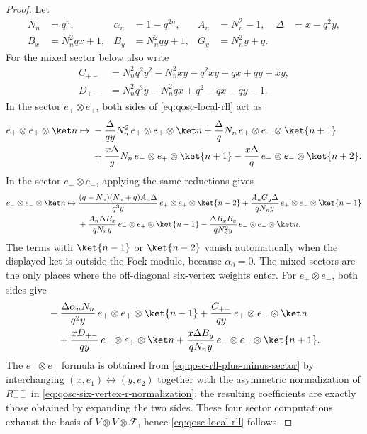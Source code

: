 \begin{proof}
Let
\begin{align*}
  N_n&=q^n,&
  \alpha_n&=1-q^{2n},&
  A_n&=N_n^2-1,&
  \Delta&=x-q^2y,\\
  B_x&=N_n^2qx+1,&
  B_y&=N_n^2qy+1,&
  G_y&=N_n^2y+q .
\end{align*}
For the mixed sector below also write
\begin{align*}
  C_{+-}&=N_n^2q^2y^2-N_n^2xy-q^2xy-qx+qy+xy,\\
  D_{+-}&=N_n^2q^3y-N_n^2qx+q^2+qx-qy-1 .
\end{align*}
In the sector \(e_+\otimes e_+\), both sides of
\eqref{eq:qosc-local-rll} act as
\begin{align}
  e_+\otimes e_+\otimes\ket n
  \mapsto\;&
  -\frac{\Delta}{qy}N_n^2\,e_+\otimes e_+\otimes\ket n
  +\frac{\Delta}{q}N_n\,e_+\otimes e_-\otimes\ket{n+1}
  \nonumber\\
  &+\frac{x\Delta}{y}N_n\,e_-\otimes e_+\otimes\ket{n+1}
  -\frac{x\Delta}{q}\,e_-\otimes e_-\otimes\ket{n+2}.
  \label{eq:qosc-rll-plus-plus-sector}
\end{align}
In the sector \(e_-\otimes e_-\), applying the same reductions gives
\begin{align}
  e_-\otimes e_-\otimes\ket n
  \mapsto\;&
  \frac{(q-N_n)(N_n+q)A_n\Delta}{q^3y}\,
    e_+\otimes e_+\otimes\ket{n-2}
  +\frac{A_nG_y\Delta}{qN_ny}\,
    e_+\otimes e_-\otimes\ket{n-1}
  \nonumber\\
  &+\frac{A_n\Delta B_x}{qN_ny}\,
    e_-\otimes e_+\otimes\ket{n-1}
  -\frac{\Delta B_xB_y}{qN_n^2y}\,
    e_-\otimes e_-\otimes\ket n .
  \label{eq:qosc-rll-minus-minus-sector}
\end{align}
The terms with \(\ket{n-1}\) or \(\ket{n-2}\) vanish automatically when
the displayed ket is outside the Fock module, because
\(\alpha_0=0\).  The mixed sectors are the only places where the
off-diagonal six-vertex weights enter.  For \(e_+\otimes e_-\), both sides
give
\begin{align}
  &-\frac{\Delta\alpha_nN_n}{q^2y}\,
    e_+\otimes e_+\otimes\ket{n-1}
  +\frac{C_{+-}}{qy}\,
    e_+\otimes e_-\otimes\ket n
  \nonumber\\
  &\quad
  +\frac{xD_{+-}}{qy}\,
    e_-\otimes e_+\otimes\ket n
  +\frac{x\Delta B_y}{qN_ny}\,
    e_-\otimes e_-\otimes\ket{n+1}.
  \label{eq:qosc-rll-plus-minus-sector}
\end{align}
The \(e_-\otimes e_+\) formula is obtained from
\eqref{eq:qosc-rll-plus-minus-sector} by interchanging
\((x,e_1)\leftrightarrow(y,e_2)\) together with the asymmetric
normalization of \(R^{-+}_{+-}\) in
\eqref{eq:qosc-six-vertex-r-normalization}; the resulting coefficients
are exactly those obtained by expanding the two sides.  These four sector
computations exhaust the basis of \(V\otimes V\otimes\mathcal F\), hence
\eqref{eq:qosc-local-rll} follows.
\end{proof}

